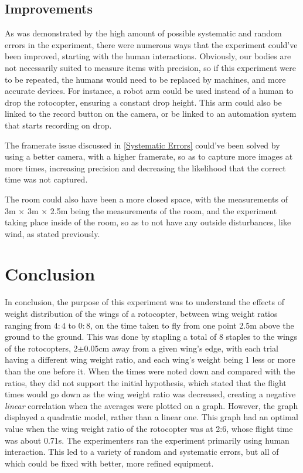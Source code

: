 \documentclass[]{article}
\theoremstyle{definition}
\begin{document}
\subsection{Improvements}
As was demonstrated by the high amount of possible systematic and random errors in the experiment, there were numerous ways that the experiment could've been improved, starting with the human interactions. Obviously, our bodies are not necessarily suited to measure items with precision, so if this experiment were to be repeated, the humans would need to be replaced by machines, and more accurate devices. For instance, a robot arm could be used instead of a human to drop the rotocopter, ensuring a constant drop height. This arm could also be linked to the record button on the camera, or be linked to an automation system that starts recording on drop.

The framerate issue discussed in \ref{Systematic Errors} could've been solved by using a better camera, with a higher framerate, so as to capture more images at more times, increasing precision and decreasing the likelihood that the correct time was not captured.

The room could also have been a more closed space, with the measurements of 3m $\times$ 3m $\times$ 2.5m being the measurements of the room, and the experiment taking place inside of the room, so as to not have any outside disturbances, like wind, as stated previously.

\section{Conclusion}
In conclusion, the purpose of this experiment was to understand the effects of weight distribution of the wings of a rotocopter, between wing weight ratios ranging from $4:4$ to $0:8$, on the time taken to fly from one point 2.5m above the ground to the ground. This was done by stapling a total of 8 staples to the wings of the rotocopters, 2$\pm$0.05cm away from a given wing's edge, with each trial having a different wing weight ratio, and each wing's weight being 1 less or more than the one before it. When the times were noted down and compared with the ratios, they did not support the initial hypothesis, which stated that the flight times would go down as the wing weight ratio was decreased, creating a negative \textit{linear} correlation when the averages were plotted on a graph. However, the graph displayed a quadratic model, rather than a linear one. This graph had an optimal value when the wing weight ratio of the rotocopter was at 2:6, whose flight time was about 0.71s. The experimenters ran the experiment primarily using human interaction. This led to a variety of random and systematic errors, but all of which could be fixed with better, more refined equipment.
\end{document}
